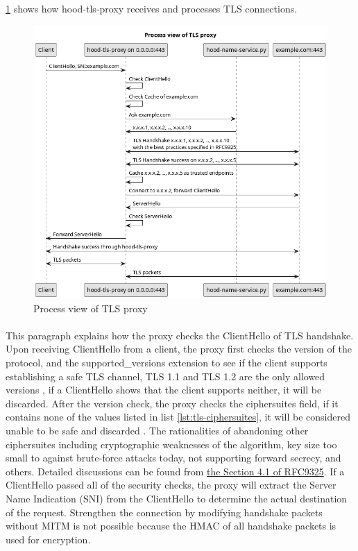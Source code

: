 \documentclass[mscthesis]{usiinfthesis}
\begin{document}
\paragraph{}
\cref{fig:tls-proxy-process-view} shows how hood-tls-proxy receives and processes TLS connections.
\begin{figure}[H]
  \includegraphics[width=\textwidth]{graphics/puml/process-tls-proxy.png}
  \caption{Process view of TLS proxy}
  \label{fig:tls-proxy-process-view}
\end{figure}

\paragraph{}
This paragraph explains how the proxy checks the ClientHello of TLS handshake. Upon receiving ClientHello from a client, the proxy first checks the version of the protocol, and the supported\_versions extension to see if the client supports establishing a safe TLS channel, TLS 1.1 and TLS 1.2 are the only allowed versions \citep{rfc:bstprc}, if a ClientHello shows that the client supports neither, it will be discarded. After the version check, the proxy checks the ciphersuites field, if it contains none of the values listed in list \ref{lst:tls-ciphersuites}, it will be considered unable to be safe and discarded \citep{rfc:bstprc}. The rationalities of abandoning other ciphersuites including cryptographic weaknesses of the algorithm, key size too small to against brute-force attacks today, not supporting forward secrecy, and others. Detailed discussions can be found from \href{https://www.rfc-editor.org/rfc/rfc9325.html#name-general-guidelines}{the Section 4.1 of RFC9325}. If a ClientHello passed all of the security checks, the proxy will extract the Server Name Indication (SNI) from the ClientHello to determine the actual destination of the request. Strengthen the connection by modifying handshake packets without MITM is not possible because the HMAC of all handshake packets is used for encryption.
\end{document}

